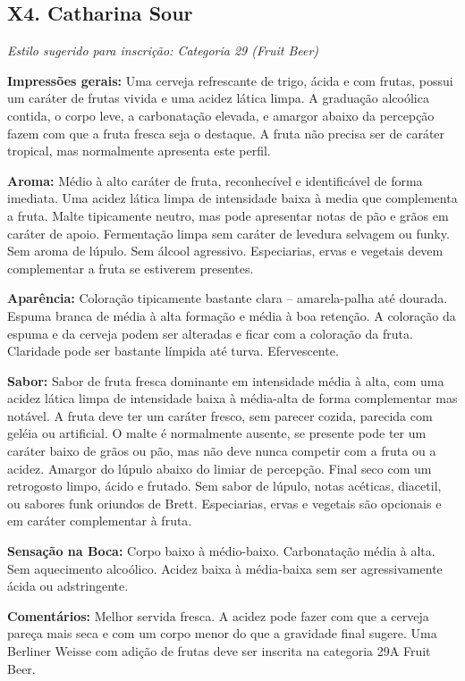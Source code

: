 \subsection*{X4. Catharina Sour}

\textit{Estilo sugerido para inscrição: Categoria 29 (Fruit Beer)}

\textbf{Impressões gerais:} Uma cerveja refrescante de trigo, ácida e com frutas, possui um caráter de frutas vivida e uma acidez lática limpa. A graduação alcoólica contida, o corpo leve, a carbonatação elevada, e amargor abaixo da percepção fazem com que a fruta fresca seja o destaque. A fruta não precisa ser de caráter tropical, mas normalmente apresenta este perfil.

\textbf{Aroma:} Médio à alto caráter de fruta, reconhecível e identificável de forma imediata. Uma acidez lática limpa de intensidade baixa à media que complementa a fruta. Malte tipicamente neutro, mas pode apresentar notas de pão e grãos em caráter de apoio. Fermentação limpa sem caráter de levedura selvagem ou funky. Sem aroma de lúpulo. Sem álcool agressivo. Especiarias, ervas e vegetais devem complementar a fruta se estiverem presentes.

\textbf{Aparência:} Coloração tipicamente bastante clara – amarela-palha até dourada. Espuma branca de média à alta formação e média à boa retenção. A coloração da espuma e da cerveja podem ser alteradas e ficar com a coloração da fruta. Claridade pode ser bastante límpida até turva. Efervescente.

\textbf{Sabor:} Sabor de fruta fresca dominante em intensidade média à alta, com uma acidez lática limpa de intensidade baixa à média-alta de forma complementar mas notável. A fruta deve ter um caráter fresco, sem parecer cozida, parecida com geléia ou artificial. O malte é normalmente ausente, se presente pode ter um caráter baixo de grãos ou pão, mas não deve nunca competir com a fruta ou a acidez. Amargor do lúpulo abaixo do limiar de percepção. Final seco com um retrogosto limpo, ácido e frutado. Sem sabor de lúpulo, notas acéticas, diacetil, ou sabores funk oriundos de Brett. Especiarias, ervas e vegetais são opcionais e em caráter complementar à fruta.

\textbf{Sensação na Boca:} Corpo baixo à médio-baixo. Carbonatação média à alta. Sem aquecimento alcoólico. Acidez baixa à média-baixa sem ser agressivamente ácida ou adstringente.

\textbf{Comentários:} Melhor servida fresca. A acidez pode fazer com que a cerveja pareça mais seca e com um corpo menor do que a gravidade final sugere. Uma Berliner Weisse com adição de frutas deve ser inscrita na categoria 29A Fruit Beer.

